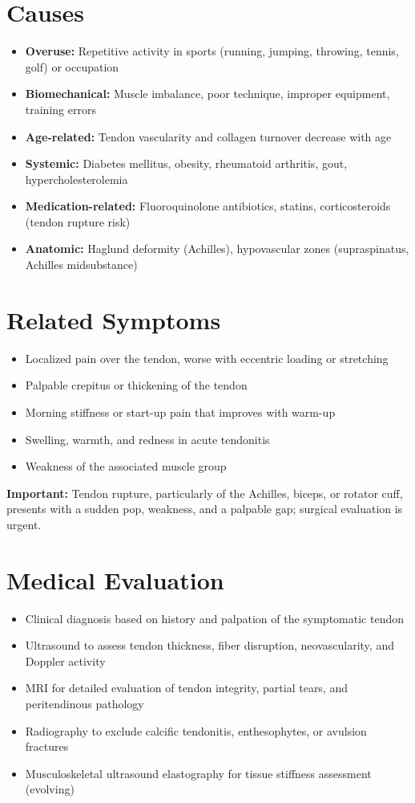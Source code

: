 \section*{Causes}
\begin{itemize}
  \item \textbf{Overuse:} Repetitive activity in sports (running, jumping, throwing, tennis, golf) or occupation
  \item \textbf{Biomechanical:} Muscle imbalance, poor technique, improper equipment, training errors
  \item \textbf{Age-related:} Tendon vascularity and collagen turnover decrease with age
  \item \textbf{Systemic:} Diabetes mellitus, obesity, rheumatoid arthritis, gout, hypercholesterolemia
  \item \textbf{Medication-related:} Fluoroquinolone antibiotics, statins, corticosteroids (tendon rupture risk)
  \item \textbf{Anatomic:} Haglund deformity (Achilles), hypovascular zones (supraspinatus, Achilles midsubstance)
\end{itemize}

\section*{Related Symptoms}
\begin{itemize}
  \item Localized pain over the tendon, worse with eccentric loading or stretching
  \item Palpable crepitus or thickening of the tendon
  \item Morning stiffness or start-up pain that improves with warm-up
  \item Swelling, warmth, and redness in acute tendonitis
  \item Weakness of the associated muscle group
\end{itemize}
\textbf{Important:} Tendon rupture, particularly of the Achilles, biceps, or rotator cuff, presents with a sudden pop, weakness, and a palpable gap; surgical evaluation is urgent.

\section*{Medical Evaluation}
\begin{itemize}
  \item Clinical diagnosis based on history and palpation of the symptomatic tendon
  \item Ultrasound to assess tendon thickness, fiber disruption, neovascularity, and Doppler activity
  \item MRI for detailed evaluation of tendon integrity, partial tears, and peritendinous pathology
  \item Radiography to exclude calcific tendonitis, enthesophytes, or avulsion fractures
  \item Musculoskeletal ultrasound elastography for tissue stiffness assessment (evolving)
\end{itemize}

